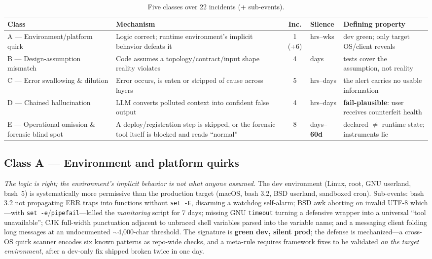\documentclass[conference]{IEEEtran}
\begin{document}
\begin{table}[t]
\centering
\caption{Five classes over 22 incidents (+ sub-events).}
\label{tab:taxonomy}
\footnotesize
\begin{tabular}{@{}p{2.4cm}p{5.2cm}cp{1.6cm}p{4.4cm}@{}}
\toprule
\textbf{Class} & \textbf{Mechanism} & \textbf{Inc.} & \textbf{Silence} & \textbf{Defining property}\\
\midrule
A --- Environment/platform quirk & Logic correct; runtime environment's implicit behavior defeats it & 1 (+6) & hrs--wks & dev green; only target OS/client reveals\\
B --- Design-assumption mismatch & Code assumes a topology/contract/input shape reality violates & 4 & days & tests cover the assumption, not reality\\
C --- Error swallowing \& dilution & Error occurs, is eaten or stripped of cause across layers & 5 & hrs--days & the alert carries no usable information\\
D --- Chained hallucination & LLM converts polluted context into confident false output & 4 & hrs--days & \textbf{fail-plausible}: user receives counterfeit health\\
E --- Operational omission \& forensic blind spot & A deploy/registration step is skipped, or the forensic tool itself is blocked and reads ``normal'' & 8 & days--\textbf{60d} & declared $\neq$ runtime state; instruments lie\\
\bottomrule
\end{tabular}
\end{table}

\subsection{Class A --- Environment and platform quirks}
\emph{The logic is right; the environment's implicit behavior is not what
anyone assumed.} The dev environment (Linux, root, GNU userland, bash~5)
is systematically more permissive than the production target (macOS, bash
3.2, BSD userland, sandboxed cron). Sub-events: bash 3.2 not propagating
ERR traps into functions without \texttt{set~-E}, disarming a watchdog
self-alarm; BSD awk aborting on invalid UTF-8 which---with
\texttt{set~-e}/\texttt{pipefail}---killed the \emph{monitoring} script
for 7 days; missing GNU \texttt{timeout} turning a defensive wrapper into
a universal ``tool unavailable''; CJK full-width punctuation adjacent to
unbraced shell variables parsed into the variable name; and a messaging
client folding long messages at an undocumented $\sim$4{,}000-char
threshold. The signature is \textbf{green dev, silent prod}; the defense
is mechanized---a cross-OS quirk scanner encodes six known patterns as
repo-wide checks, and a meta-rule requires framework fixes to be validated
\emph{on the target environment}, after a dev-only fix shipped broken
twice in one day.
\end{document}
